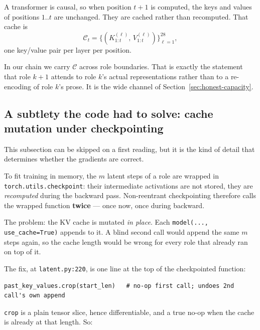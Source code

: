 \documentclass[11pt]{article}
\theoremstyle{definition}
\begin{document}
A transformer is causal, so when position $t+1$ is computed, the keys and values of positions $1..t$ are unchanged. They are cached rather than recomputed. That cache is
\[
\mathcal{C}_t = \big\{(K^{(\ell)}_{1:t},\,V^{(\ell)}_{1:t})\big\}_{\ell=1}^{28},
\]
one key/value pair per layer per position.

In our chain we carry $\mathcal{C}$ across role boundaries. That is exactly the statement that role $k+1$ attends to role $k$'s actual representations rather than to a re-encoding of role $k$'s prose. It is the wide channel of Section~\ref{sec:honest-capacity}.

\begin{center}
\end{center}

\subsection{A subtlety the code had to solve: cache mutation under checkpointing}

This subsection can be skipped on a first reading, but it is the kind of detail that determines whether the gradients are correct.

To fit training in memory, the $m$ latent steps of a role are wrapped in \texttt{torch.utils.checkpoint}: their intermediate activations are not stored, they are \emph{recomputed} during the backward pass. Non-reentrant checkpointing therefore calls the wrapped function \textbf{twice} --- once now, once during backward.

The problem: the KV cache is mutated \emph{in place}. Each \texttt{model(..., use\_cache=True)} appends to it. A blind second call would append the same $m$ steps again, so the cache length would be wrong for every role that already ran on top of it.

The fix, at \texttt{latent.py:220}, is one line at the top of the checkpointed function:
\begin{lstlisting}
past_key_values.crop(start_len)   # no-op first call; undoes 2nd call's own append
\end{lstlisting}
\texttt{crop} is a plain tensor slice, hence differentiable, and a true no-op when the cache is already at that length. So:
\end{document}

